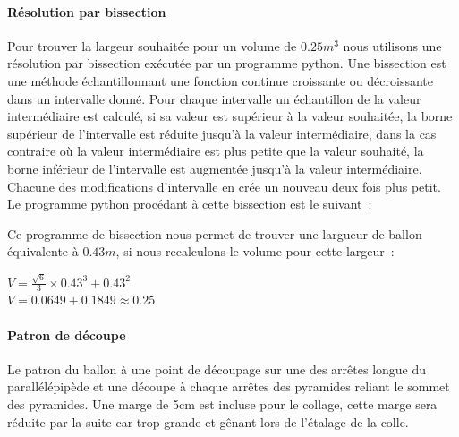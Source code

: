 \documentclass[a4paper,11pt]{article}
\begin{document}


\paragraph{Résolution par bissection}

Pour trouver la largeur souhaitée pour un volume de $0.25m^3$ nous utilisons une résolution par bissection exécutée par un programme python. Une bissection est une méthode échantillonnant une fonction continue croissante ou décroissante dans un intervalle donné. Pour chaque intervalle un échantillon de la valeur intermédiaire est calculé, si sa valeur est supérieur à la valeur souhaitée, la borne supérieur de l'intervalle est réduite jusqu'à la valeur intermédiaire, dans la cas contraire où la valeur intermédiaire est plus petite que la valeur souhaité, la borne inférieur de l'intervalle est augmentée jusqu'à la valeur intermédiaire. Chacune des modifications d'intervalle en crée un nouveau deux fois plus petit.
\medbreak
Le programme python procédant à cette bissection est le suivant~:



Ce programme de bissection nous permet de trouver une largueur de ballon équivalente à $0.43m$, si nous recalculons le volume pour cette largeur~:

\begin{center}
  $\displaystyle{V = \frac{\sqrt{6}}{3} \times 0.43^3 + 0.43^2 }$ \\
	$\displaystyle{V = 0.0649 + 0.1849 \approx 0.25}$
\end{center}

\paragraph{Patron de découpe}

Le patron du ballon à une point de découpage sur une des arrêtes longue du parallélépipède et une découpe à chaque arrêtes des pyramides reliant le sommet des pyramides. Une marge de 5cm est incluse pour le collage, cette marge sera réduite par la suite car trop grande et gênant lors de l'étalage de la colle.
\end{document}
